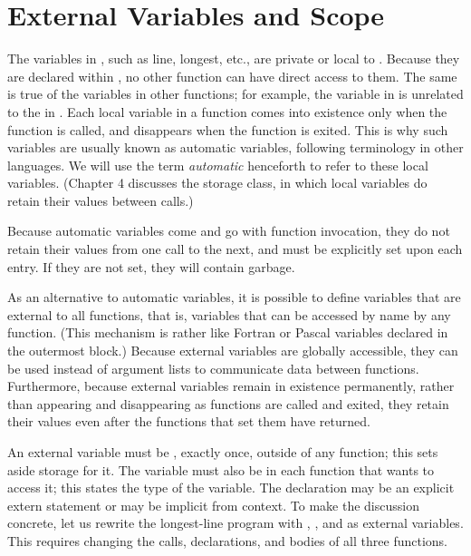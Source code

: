 \section{External Variables and Scope}


The variables in , such as line, longest, etc., are private or local to .
Because they are declared within , no other function can have direct access to them.
The same is true of the variables in other functions; for example, the variable  in  is unrelated to the  in .
Each local variable in a function comes into existence only when the function is called, and disappears when the function is exited.
This is why such variables are usually known as automatic variables, following terminology in other languages.
We will use the term \emph{automatic} henceforth to refer to these local variables.
(Chapter 4 discusses the  storage class, in which local variables do retain their values between calls.)

Because automatic variables come and go with function invocation, they do not retain their values from one call to the next, and must be explicitly set upon each entry.
If they are not set, they will contain garbage.

As an alternative to automatic variables, it is possible to define variables that are external to all functions, that is, variables that can be accessed by name by any function.
(This mechanism is rather like Fortran  or Pascal variables declared in the outermost block.)
Because external variables are globally accessible, they can be used instead of argument lists to communicate data between functions.
Furthermore, because external variables remain in existence permanently, rather than appearing and disappearing as functions are called and exited, they retain their values even after the functions that set them have returned.

An external variable must be , exactly once, outside of any function; this sets aside storage for it.
The variable must also be  in each function that wants to access it; this states the type of the variable.
The declaration may be an explicit extern statement or may be implicit from context.
To make the discussion concrete, let us rewrite the longest-line program with , , and  as external variables.
This requires changing the calls, declarations, and bodies of all three functions.

